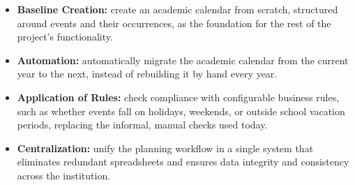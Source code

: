 \begin{itemize}
    \item \textbf{Baseline Creation:} create an academic calendar from scratch, structured around events and their occurrences, as the foundation for the rest of the project's functionality.
    \item \textbf{Automation:} automatically migrate the academic calendar from the current year to the next, instead of rebuilding it by hand every year.
    \item \textbf{Application of Rules:} check compliance with configurable business rules, such as whether events fall on holidays, weekends, or outside school vacation periods, replacing the informal, manual checks used today.
    \item \textbf{Centralization:} unify the planning workflow in a single system that eliminates redundant spreadsheets and ensures data integrity and consistency across the institution.
\end{itemize}
